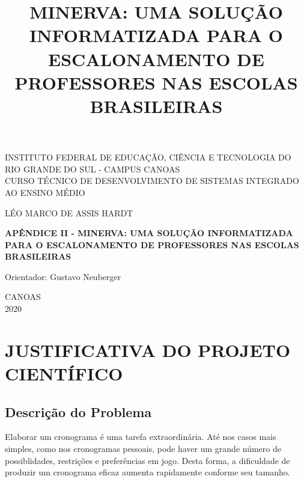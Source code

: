 \documentclass[12pt,a4paper]{article}
\title{MINERVA: UMA SOLUÇÃO INFORMATIZADA PARA O ESCALONAMENTO DE PROFESSORES NAS ESCOLAS BRASILEIRAS}
\newenvironment{bottompar}{\par\vspace*{\fill}}{\clearpage}
\begin{document}
		\thispagestyle{empty}

		\begin{center}
			INSTITUTO FEDERAL DE EDUCAÇÃO, CIÊNCIA E TECNOLOGIA DO RIO GRANDE DO SUL - CAMPUS CANOAS \\
			CURSO TÉCNICO DE DESENVOLVIMENTO DE SISTEMAS INTEGRADO AO ENSINO MÉDIO\\
		\end{center}

		\vskip 3cm

		\begin{center}
			LÉO MARCO DE ASSIS HARDT
		\end{center}

		\vskip 5cm

		\begin{center}
			\textbf{APÊNDICE II - MINERVA: UMA SOLUÇÃO INFORMATIZADA PARA O ESCALONAMENTO DE PROFESSORES NAS ESCOLAS BRASILEIRAS}
		\end{center}

		\vskip 5cm

		\begin{center}
			Orientador: Gustavo Neuberger
		\end{center}

		\begin{bottompar}
			\begin{center}
			CANOAS \\
			2020
			\end{center}
		\end{bottompar}

    \section{JUSTIFICATIVA DO PROJETO CIENTÍFICO}

		\subsection{Descrição do Problema}


			\par Elaborar um cronograma é uma tarefa extraordinária. Até nos casos mais simples, como nos cronogramas pessoais, pode haver um grande número de possiblidades, restrições e preferências em jogo. Desta forma, a dificuldade de produzir um cronograma eficaz aumenta rapidamente conforme seu tamanho.
\end{document}
